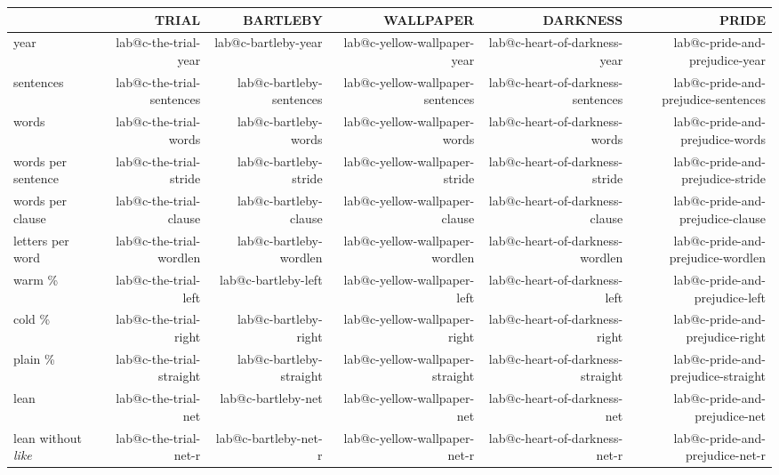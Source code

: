 \documentclass[8pt,twoside]{memoir}
\makeatletter
\newcommand\lab[1]{\csname lab@#1\endcsname}
\newcommand\mono[1]{{\monofont\fontsize{5.6}{7}\selectfont\MakeUppercase{#1}}}
\newcommand\folio{\vfill\noindent\makebox[\textwidth][\ifodd\value{page}r\else l\fi]{\mono{\thepage}}}
\newcommand\kicker[2]{\noindent\mono{#1\quad —\quad #2}\par\vspace{2.2mm}}
\newcommand\zpage[3]{\kicker{#1}{#2}#3\folio\newpage}
\makeatother
\begin{document}
\zpage{28}{The numbers}{%
\begin{center}\fontsize{7.4}{9.2}\selectfont\setlength\tabcolsep{3.5pt}
\begin{tabular}{@{}lrrrrr@{}}
\toprule
 & \mono{Trial} & \mono{Bartleby} & \mono{Wallpaper} & \mono{Darkness} & \mono{Pride}\\
\midrule
year & \lab{c-the-trial-year} & \lab{c-bartleby-year} & \lab{c-yellow-wallpaper-year} & \lab{c-heart-of-darkness-year} & \lab{c-pride-and-prejudice-year}\\
sentences & \lab{c-the-trial-sentences} & \lab{c-bartleby-sentences} & \lab{c-yellow-wallpaper-sentences} & \lab{c-heart-of-darkness-sentences} & \lab{c-pride-and-prejudice-sentences}\\
words & \lab{c-the-trial-words} & \lab{c-bartleby-words} & \lab{c-yellow-wallpaper-words} & \lab{c-heart-of-darkness-words} & \lab{c-pride-and-prejudice-words}\\
words per sentence & \lab{c-the-trial-stride} & \lab{c-bartleby-stride} & \lab{c-yellow-wallpaper-stride} & \lab{c-heart-of-darkness-stride} & \lab{c-pride-and-prejudice-stride}\\
words per clause & \lab{c-the-trial-clause} & \lab{c-bartleby-clause} & \lab{c-yellow-wallpaper-clause} & \lab{c-heart-of-darkness-clause} & \lab{c-pride-and-prejudice-clause}\\
letters per word & \lab{c-the-trial-wordlen} & \lab{c-bartleby-wordlen} & \lab{c-yellow-wallpaper-wordlen} & \lab{c-heart-of-darkness-wordlen} & \lab{c-pride-and-prejudice-wordlen}\\
warm \% & \lab{c-the-trial-left} & \lab{c-bartleby-left} & \lab{c-yellow-wallpaper-left} & \lab{c-heart-of-darkness-left} & \lab{c-pride-and-prejudice-left}\\
cold \% & \lab{c-the-trial-right} & \lab{c-bartleby-right} & \lab{c-yellow-wallpaper-right} & \lab{c-heart-of-darkness-right} & \lab{c-pride-and-prejudice-right}\\
plain \% & \lab{c-the-trial-straight} & \lab{c-bartleby-straight} & \lab{c-yellow-wallpaper-straight} & \lab{c-heart-of-darkness-straight} & \lab{c-pride-and-prejudice-straight}\\
lean & \lab{c-the-trial-net} & \lab{c-bartleby-net} & \lab{c-yellow-wallpaper-net} & \lab{c-heart-of-darkness-net} & \lab{c-pride-and-prejudice-net}\\
lean without \emph{like} & \lab{c-the-trial-net-r} & \lab{c-bartleby-net-r} & \lab{c-yellow-wallpaper-net-r} & \lab{c-heart-of-darkness-net-r} & \lab{c-pride-and-prejudice-net-r}\\

\end{tabular}
\end{center}}
\end{document}
